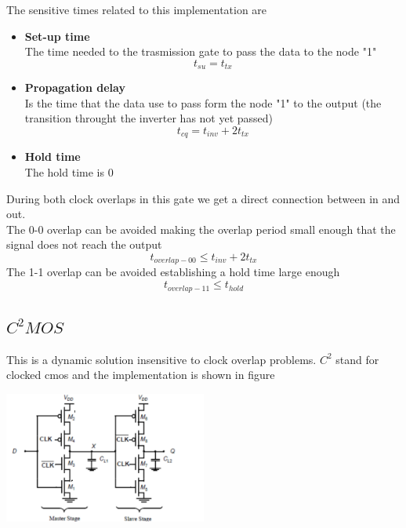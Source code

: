 The sensitive times related to this implementation are
\begin{itemize}
\item 
{\bf Set-up time}\\
The time needed to the trasmission gate to pass the data to the node "1"
\begin{equation}
t_{su}=t_{tx}
\end{equation}

\item 
{\bf Propagation delay}\\
Is the time that the data use to pass form the node "1" to the output (the transition throught the inverter has not yet passed)
\begin{equation}
t_{cq}=t_{inv}+2t_{tx}
\end{equation}

\item
{\bf Hold time}\\
The hold time is 0

\end{itemize}
\vspace{5mm}
During both clock overlaps in this gate we get a direct connection between in and out.\\
The 0-0 overlap can be avoided making the overlap period small enough that the signal does not reach the output 
\begin{equation}
t_{overlap-00}\le t_{inv}+2t_{tx}
\end{equation} 
The 1-1 overlap can be avoided establishing a hold time large enough 
\begin{equation}
t_{overlap-11}\le t_{hold}
\end{equation}

\subsection{$C^2 MOS$}
This is a dynamic solution insensitive to clock overlap problems. $C^2$ stand for clocked cmos and the implementation is shown in figure 

\centering
\includegraphics[width=0.5\textwidth]{C10_16.png}\\
\raggedright

